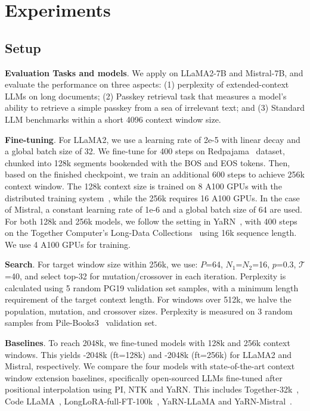 \documentclass{article}
\theoremstyle{plain}
\theoremstyle{definition}
\theoremstyle{remark}
\begin{document}
\vspace{-2ex} 
 \section{Experiments}
 \vspace{-1ex} 
 \label{sec:exp}
\subsection{Setup}
\noindent\textbf{Evaluation Tasks and models}. We apply {\sysname} on LLaMA2-7B and Mistral-7B, and evaluate the performance on three aspects: (1) perplexity of extended-context LLMs on long documents; (2) Passkey retrieval task that measures a model's ability to retrieve a simple passkey from a sea of irrelevant text; and (3) Standard LLM benchmarks within a short 4096 context window size. 



\noindent\textbf{Fine-tuning}. For LLaMA2, we use a learning rate of 2e-5 with linear decay and a global batch size of 32. We fine-tune for 400 steps on  Redpajama~\cite{redpajama} dataset, chunked into  128k segments bookended with the BOS and EOS tokens. Then, based on the finished checkpoint, we train an additional 600 steps to achieve 256k context window. The 128k context size is trained on 8 A100 GPUs with the distributed training system~\cite{cube}, while the 256k requires 16 A100 GPUs. 
In the case of Mistral, a constant learning rate of 1e-6 and a global batch size of 64 are used. For both 128k and 256k  models, we follow the setting in YaRN~\cite{yarn}, with  400 steps on the Together Computer's Long-Data Collections~\cite{mistraldata} using 16k sequence length. We use 4 A100 GPUs for training.


\noindent\textbf{Search}. For target window size within 256k,
we use:  $P$=64, $N_1$=$N_2$=16, $p$=0.3, $\mathcal{T}$=40, and select top-32 for mutation/crossover in each iteration. Perplexity is calculated using 5 random PG19 validation set samples, with a minimum length requirement of the target context length. For windows over 512k, 
 we halve the population, mutation, and crossover sizes. Perplexity is measured on 3 random samples from Pile-Books3~\cite{pile} validation set. 

\noindent\textbf{Baselines}. To reach 2048k, we fine-tuned models with 128k and 256k context windows. This yields {\sysname}-2048k (ft=128k) and {\sysname}-2048k (ft=256k) for LLaMA2 and Mistral, respectively.
We compare the four models with state-of-the-art context window extension baselines, specifically open-sourced LLMs fine-tuned after positional interpolation using PI, NTK and YaRN.  This includes Together-32k~\cite{together}, Code LLaMA~\cite{codellama}, LongLoRA-full-FT-100k~\cite{longlora}, YaRN-LLaMA and YaRN-Mistral~\cite{yarn}. 
\end{document}

